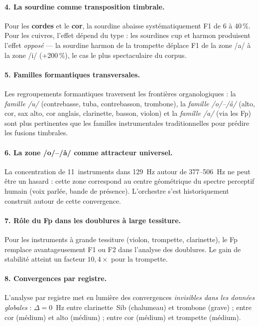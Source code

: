 \documentclass[11pt,a4paper]{article}
\begin{document}
\paragraph{4. La sourdine comme transposition timbrale.}
Pour les \textbf{cordes} et le \textbf{cor}, la sourdine abaisse
systématiquement F1 de 6 à 40\,\%. Pour les cuivres, l'effet dépend du
type : les sourdines cup et harmon produisent l'effet \emph{opposé} ---
la sourdine harmon de la trompette déplace F1 de la zone /a/ à la zone
/i/ (+200\,\%), le cas le plus spectaculaire du corpus.

\paragraph{5. Familles formantiques transversales.}
Les regroupements formantiques traversent les frontières organologiques :
la \emph{famille /u/} (contrebasse, tuba, contrebasson, trombone),
la \emph{famille /o/--/\r{a}/} (alto, cor, sax alto, cor anglais,
clarinette, basson, violon) et la \emph{famille /a/} (via les Fp)
sont plus pertinentes que les familles instrumentales traditionnelles
pour prédire les fusions timbrales.

\paragraph{6. La zone /o/--/\r{a}/ comme attracteur universel.}
La concentration de 11~instruments dans 129~Hz autour de
377--\SI{506}{Hz} ne peut être un hasard : cette zone correspond au
centre géométrique du spectre perceptif humain (voix parlée, bande de
présence). L'orchestre s'est historiquement construit autour de cette
convergence.

\paragraph{7. Rôle du Fp dans les doublures à large tessiture.}
Pour les instruments à grande tessiture (violon, trompette, clarinette),
le Fp remplace avantageusement F1 ou F2 dans l'analyse des doublures.
Le gain de stabilité atteint un facteur $10{,}4\times$ pour la
trompette.

\paragraph{8. Convergences par registre.}
L'analyse par registre met en lumière des convergences
\emph{invisibles dans les données globales} : $\Delta = 0$~Hz entre
clarinette~Sib (chalumeau) et trombone (grave) ; entre cor (médium)
et alto (médium) ; entre cor (médium) et trompette (médium).
\end{document}
